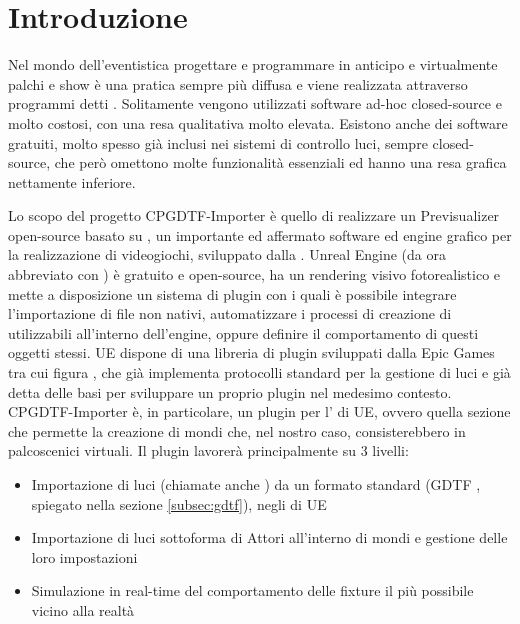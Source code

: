\documentclass[main.tex]{subfiles}
\begin{document}
\sloppy


\vspace{1.0cm}

\section{Introduzione}\label{sec:Introduzione}
Nel mondo dell'eventistica progettare e programmare in anticipo e virtualmente palchi e show è una pratica sempre più diffusa e viene realizzata attraverso programmi detti . Solitamente vengono utilizzati software\cite{capture} ad-hoc closed-source e molto costosi, con una resa qualitativa molto elevata. Esistono anche dei software gratuiti, molto spesso già inclusi nei sistemi di controllo luci, sempre closed-source, che però omettono molte funzionalità essenziali ed hanno una resa grafica nettamente inferiore.\newline

Lo scopo del progetto CPGDTF-Importer è quello di realizzare un Previsualizer open-source basato su \cite{UnrealEngine}, un importante ed affermato software ed engine grafico per la realizzazione di videogiochi, sviluppato dalla . Unreal Engine (da ora abbreviato con ) è gratuito e open-source, ha un rendering visivo fotorealistico e mette a disposizione un sistema di plugin con i quali è possibile integrare l'importazione di file non nativi, automatizzare i processi di creazione di  utilizzabili all'interno dell'engine, oppure definire il comportamento di questi oggetti stessi. UE dispone di una libreria di plugin sviluppati dalla Epic Games tra cui figura , che già implementa protocolli standard per la gestione di luci e già detta delle basi per sviluppare un proprio plugin nel medesimo contesto.  
\newline
CPGDTF-Importer è, in particolare, un plugin per l' di UE, ovvero quella sezione che permette la creazione di mondi che, nel nostro caso, consisterebbero in palcoscenici virtuali. Il plugin lavorerà principalmente su 3 livelli:
\begin{itemize}
    \item Importazione di luci (chiamate anche ) da un formato standard (GDTF \cite{GDTF}, spiegato nella sezione \ref{subsec:gdtf}), negli  di UE
    \item Importazione di luci sottoforma di Attori all'interno di mondi e gestione delle loro impostazioni
    \item Simulazione in real-time del comportamento delle fixture il più possibile vicino alla realtà
\end{itemize}
\end{document}
